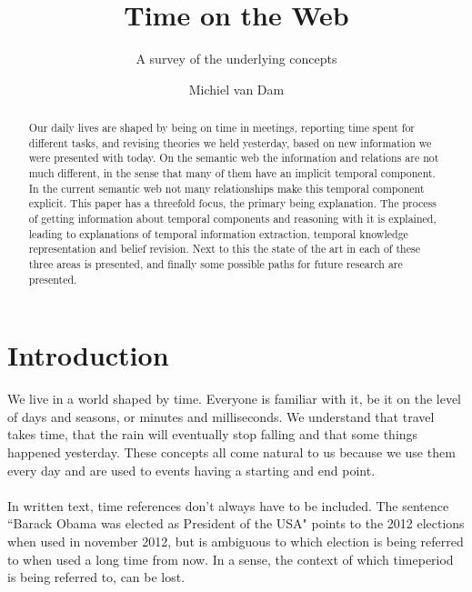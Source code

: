 \documentclass{llncs}
\begin{document}
\title{Time on the Web}
\subtitle{A survey of the underlying concepts}
\author{Michiel van Dam}

\maketitle

\begin{abstract}
Our daily lives are shaped by being on time in meetings, reporting time spent for different tasks, and revising theories we held yesterday, based on new information we were presented with today. On the semantic web the information and relations are not much different, in the sense that many of them have an implicit temporal component. In the current semantic web not many relationships make this temporal component explicit. This paper has a threefold focus, the primary being explanation. The process of getting information about temporal components and reasoning with it is explained, leading to explanations of temporal information extraction, temporal knowledge representation and belief revision. Next to this the state of the art in each of these three areas is presented, and finally some possible paths for future research are presented.
\end{abstract}


\section{Introduction}
\label{sec:introduction}


We live in a world shaped by time. Everyone is familiar with it, be it on the level of days and seasons, or minutes and milliseconds. We understand that travel takes time, that the rain will eventually stop falling and that some things happened yesterday. These concepts all come natural to us because we use them every day and are used to events having a starting and end point.\\
\\
In written text, time references don't always have to be included. The sentence ``Barack Obama was elected as President of the USA" points to the 2012 elections when used in november 2012, but is ambiguous to which election is being referred to when used a long time from now. In a sense, the context of which timeperiod is being referred to, can be lost.
\end{document}
